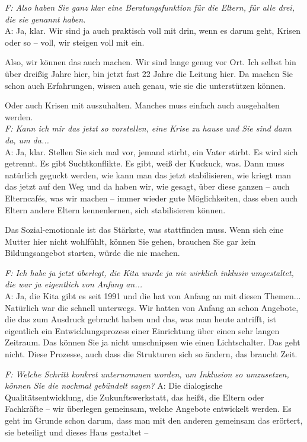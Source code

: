 \begin{linenumbers*}
\emph{F: Also haben Sie ganz klar eine Beratungsfunktion für die Eltern, für alle drei, die sie genannt haben.}\\
A: Ja, klar. Wir sind ja auch praktisch voll mit drin, wenn es darum geht, Krisen oder so -- voll, wir steigen voll mit ein. 

Also, wir können das auch machen. Wir sind lange genug vor Ort. Ich selbst bin über dreißig Jahre hier, bin jetzt fast 22 Jahre die Leitung hier. Da machen Sie schon auch Erfahrungen, wissen auch genau, wie sie die unterstützen können. 

Oder auch Krisen mit auszuhalten. Manches muss einfach auch ausgehalten werden.\\ 
\emph{F: Kann ich mir das jetzt so vorstellen, eine Krise zu hause und Sie sind dann da, um da...}\\
A: Ja, klar. Stellen Sie sich mal vor, jemand stirbt, ein Vater stirbt. Es wird sich getrennt. Es gibt Suchtkonflikte. Es gibt, weiß der Kuckuck, was. Dann muss natürlich geguckt werden, wie kann man das jetzt stabilisieren, wie kriegt man das jetzt auf den Weg und da haben wir, wie gesagt, über diese ganzen -- auch Elterncafés, was wir machen -- immer wieder gute Möglichkeiten, dass eben auch Eltern andere Eltern kennenlernen, sich stabilisieren können. 

Das Sozial-emotionale ist das Stärkste, was stattfinden muss. Wenn sich eine Mutter hier nicht wohlfühlt, können Sie gehen, brauchen Sie gar kein Bildungsangebot starten, würde die nie machen.  

\emph{F: Ich habe ja jetzt überlegt, die Kita wurde ja nie wirklich inklusiv umgestaltet, die war ja eigentlich von Anfang an...}\\
A: Ja, die Kita gibt es seit 1991 und die hat von Anfang an mit diesen Themen... Natürlich war die schnell unterwegs. Wir hatten von Anfang an schon Angebote, die das zum Ausdruck gebracht haben und das, was man heute antrifft, ist eigentlich ein Entwicklungsprozess einer Einrichtung über einen sehr langen Zeitraum. Das können Sie ja nicht umschnipsen wie einen Lichtschalter. Das geht nicht. Diese Prozesse, auch dass die Strukturen sich so ändern, das braucht Zeit. 

\emph{F: Welche Schritt konkret unternommen worden, um Inklusion so umzusetzen, können Sie die nochmal gebündelt sagen?}
A: Die dialogische Qualitätsentwicklung, die Zukunftswerkstatt, das heißt, die Eltern oder Fachkräfte -- wir überlegen gemeinsam, welche Angebote entwickelt werden. Es geht im Grunde schon darum, dass man mit den anderen gemeinsam das erörtert, sie beteiligt und dieses Haus gestaltet --  


\end{linenumbers*}
